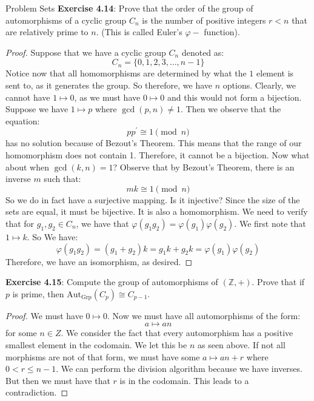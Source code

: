 \documentclass{report}
\begin{document}
\begin{exercises}{Problem Sets}
    \textbf{Exercise 4.14}: Prove that the order of the group of automorphisms of a cyclic group $C_{n}$ is the number of positive integers $r < n$ that are relatively prime to $n$. (This is called Euler's $\varphi-$ function).
        \begin{proof}
            Suppose that we have a cyclic group $C_{n}$ denoted as:
                \begin{equation*}
                    C_{n} = \{0, 1, 2, 3, \ldots, n - 1\}
                \end{equation*}
            Notice now that all homomorphisms are determined by what the $1$ element is sent to, as it generates the group. So therefore, we have $n$ options. Clearly, we cannot have $1 \mapsto 0$, as we must have $0 \mapsto 0$ and this would not form a bijection. Suppose we have $1 \mapsto p$ where $\gcd(p, n) \neq 1$. Then we observe that the equation:
                \begin{equation*}
                    pp^{\prime} \cong 1 \pmod{n}
                \end{equation*}
            has no solution because of Bezout's Theorem. This means that the range of our homomorphism does not contain 1. Therefore, it cannot be a bijection. Now what about when $\gcd(k, n) = 1$? Observe that by Bezout's Theorem, there is an inverse $m$ such that:
                \begin{equation*}
                    mk \cong 1 \pmod{n}
                \end{equation*}
            So we do in fact have a surjective mapping. Is it injective? Since the size of the sets are equal, it must be bijective. It is also a homomorphism. We need to verify that for $g_{1}, g_{2} \in C_{n}$, we have that $\varphi(g_{1}g_{2}) = \varphi(g_{1})\varphi(g_{2})$. We first note that $1 \mapsto k$. So We have:
                \begin{equation*}
                    \varphi(g_{1}g_{2}) = (g_{1} + g_{2})k = g_{1}k + g_{2}k = \varphi(g_{1})\varphi(g_{2})
                \end{equation*}
            Therefore, we have an isomorphism, as desired. 
        \end{proof}

    \textbf{Exercise 4.15}: Compute the group of automorphisms of $(\mathbb{Z}, +).$ Prove that if $p$ is prime, then $\text{Aut}_{\text{Grp}}(C_{p}) \cong C_{p - 1}$.
        \begin{proof}
            We must have $0 \mapsto 0$. Now we must have all automorphisms of the form:
                \begin{equation*}
                    a \mapsto an
                \end{equation*}
            for some $n \in Z$. We consider the fact that every automorphism has a positive smallest element in the codomain. We let this be $n$ as seen above. If not all morphisms are not of that form, we must have some $a \mapsto an + r$ where $0 < r \leq n - 1$. We can perform the division algorithm because we have inverses. But then we must have that $r$ is in the codomain. This leads to a contradiction.
        \end{proof}


\end{exercises}
\end{document}
